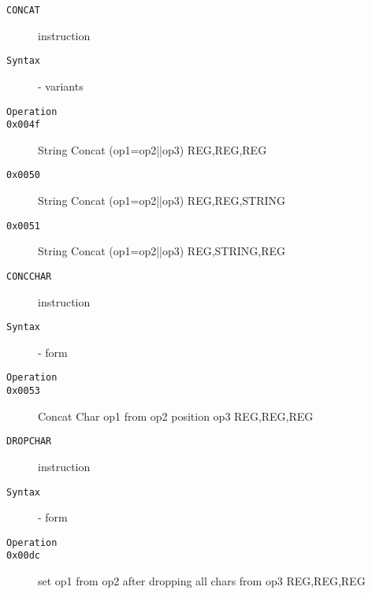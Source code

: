\begin{description}
\item[\texttt{CONCAT}] instruction\\
\item[\texttt{Syntax}] - variants\\

\item[\texttt{Operation}]
\item[\texttt{}]
\item[\texttt{0x004f}] String Concat (op1=op2||op3)  {REG,REG,REG}       \\
\item[\texttt{0x0050}] String Concat (op1=op2||op3)  {REG,REG,STRING}    \\
\item[\texttt{0x0051}] String Concat (op1=op2||op3)  {REG,STRING,REG}    \\
\end{description}
\clearpage
\begin{description}
\item[\texttt{CONCCHAR}] instruction\\
\item[\texttt{Syntax}] - form \\

\item[\texttt{Operation}]
\item[\texttt{}]
\item[\texttt{0x0053}] Concat Char op1 from op2 position op3  {REG,REG,REG}       \\
\end{description}
\clearpage
\begin{description}
\item[\texttt{DROPCHAR}] instruction\\
\item[\texttt{Syntax}] - form \\

\item[\texttt{Operation}]
\item[\texttt{}]
\item[\texttt{0x00dc}] set op1 from op2 after dropping all chars from op3  {REG,REG,REG}       \\
\end{description}
